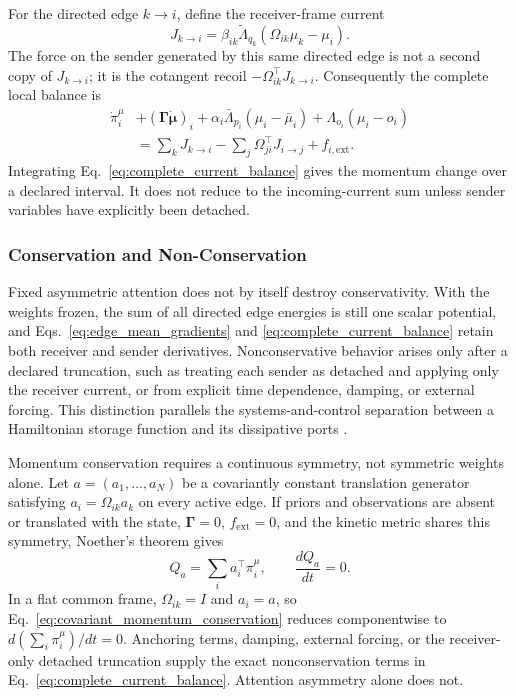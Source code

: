 \documentclass[12pt]{article}
\begin{document}
For the directed edge $k\to i$, define the receiver-frame current
\begin{equation}
\boxed{
J_{k\to i}
=\beta_{ik}\widetilde\Lambda_{q_k}
(\Omega_{ik}\mu_k-\mu_i).}
\label{eq:directed_edge_current}
\end{equation}
The force on the sender generated by this same directed edge is not a second copy of $J_{k\to i}$; it is the cotangent recoil $-\Omega_{ik}^{\top}J_{k\to i}$.  Consequently the complete local balance is
\begin{align}
\dot\pi_i^\mu
&+(\boldsymbol\Gamma\dot{\boldsymbol\mu})_i
+\alpha_i\bar\Lambda_{p_i}(\mu_i-\bar\mu_i)
+\Lambda_{o_i}(\mu_i-o_i)\nonumber\\
&=\sum_kJ_{k\to i}
-\sum_j\Omega_{ji}^{\top}J_{i\to j}
+f_{i,\mathrm{ext}}.
\label{eq:complete_current_balance}
\end{align}
Integrating Eq.~\eqref{eq:complete_current_balance} gives the momentum change over a declared interval.  It does not reduce to the incoming-current sum unless sender variables have explicitly been detached.


\subsubsection{Conservation and Non-Conservation}

Fixed asymmetric attention does not by itself destroy conservativity.  With the weights frozen, the sum of all directed edge energies is still one scalar potential, and Eqs.~\eqref{eq:edge_mean_gradients} and \eqref{eq:complete_current_balance} retain both receiver and sender derivatives.  Nonconservative behavior arises only after a declared truncation, such as treating each sender as detached and applying only the receiver current, or from explicit time dependence, damping, or external forcing.  This distinction parallels the systems-and-control separation between a Hamiltonian storage function and its dissipative ports \citep{XueHircheCao2020}.

Momentum conservation requires a continuous symmetry, not symmetric weights alone.  Let $a=(a_1,\ldots,a_N)$ be a covariantly constant translation generator satisfying $a_i=\Omega_{ik}a_k$ on every active edge.  If priors and observations are absent or translated with the state, $\boldsymbol\Gamma=0$, $f_{\mathrm{ext}}=0$, and the kinetic metric shares this symmetry, Noether's theorem gives
\begin{equation}
\boxed{
Q_a=\sum_i a_i^\top\pi_i^\mu,
\qquad
\frac{dQ_a}{dt}=0.}
\label{eq:covariant_momentum_conservation}
\end{equation}
In a flat common frame, $\Omega_{ik}=I$ and $a_i=a$, so Eq.~\eqref{eq:covariant_momentum_conservation} reduces componentwise to $d(\sum_i\pi_i^\mu)/dt=0$.  Anchoring terms, damping, external forcing, or the receiver-only detached truncation supply the exact nonconservation terms in Eq.~\eqref{eq:complete_current_balance}.  Attention asymmetry alone does not.
\end{document}
